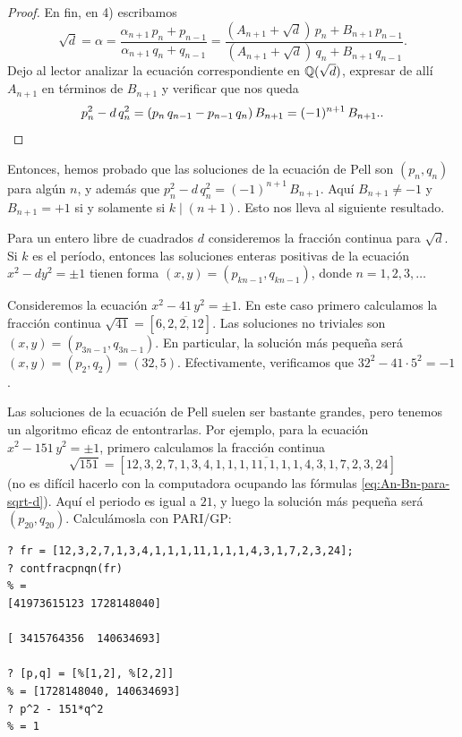 \begin{proposicion}
\begin{proof}
    En fin, en 4) escribamos
    \[ \sqrt{d} = \alpha =
       \frac{\alpha_{n+1}\,p_n + p_{n-1}}{\alpha_{n+1}\,q_n + q_{n-1}} =
       \frac{(A_{n+1} + \sqrt{d})\,p_n + B_{n+1}\,p_{n-1}}{(A_{n+1} + \sqrt{d})\,q_n + B_{n+1}\,q_{n-1}}. \]
    Dejo al lector analizar la ecuación correspondiente en $\mathbb{Q} (\sqrt{d})$,
    expresar de allí $A_{n+1}$ en términos de $B_{n+1}$ y verificar que nos
    queda
    \[ p_n^2 - d\,q_n^2 =
       (p_n\,q_{n-1} - p_{n-1}\,q_n)\,B_{n+1} = (-1)^{n+1}\,B_{n+1}. \qedhere. \]
  \end{proof}
\end{proposicion}

Entonces, hemos probado que las soluciones de la ecuación de Pell son
$(p_n,q_n)$ para algún $n$, y además que
$p_n^2 - d\,q_n^2 = (-1)^{n+1}\,B_{n+1}$. Aquí $B_{n+1} \ne -1$ y $B_{n+1} = +1$
si y solamente si $k \mid (n+1)$. Esto nos lleva al siguiente resultado.

\begin{teorema}
  Para un entero libre de cuadrados $d$ consideremos la fracción continua para
  $\sqrt{d}$. Si $k$ es el período, entonces las soluciones enteras positivas
  de la ecuación $x^2 - dy^2 = \pm 1$ tienen forma $(x,y) = (p_{kn-1}, q_{kn-1})$,
  donde $n = 1,2,3,\ldots$
\end{teorema}

\begin{ejemplo}
  Consideremos la ecuación $x^2 - 41\,y^2 = \pm 1$. En este caso primero
  calculamos la fracción continua $\sqrt{41} = [6, \overline{2,2,12}]$.
  Las soluciones no triviales son $(x,y) = (p_{3n-1}, q_{3n-1})$. En particular,
  la solución más pequeña será $(x,y) = (p_2,q_2) = (32,5)$.
  Efectivamente, verificamos que $32^2 - 41\cdot 5^2 = -1$.
\end{ejemplo}

\begin{ejemplo}
  Las soluciones de la ecuación de Pell suelen ser bastante grandes, pero
  tenemos un algoritmo eficaz de entontrarlas. Por ejemplo, para la ecuación
  $x^2 - 151\,y^2 = \pm 1$, primero calculamos la fracción continua
  $$\sqrt{151} = [12, \overline{3, 2, 7, 1, 3, 4, 1, 1, 1, 11, 1, 1, 1, 4, 3, 1, 7, 2, 3, 24}]$$
  (no es difícil hacerlo con la computadora ocupando las fórmulas
  \eqref{eq:An-Bn-para-sqrt-d}).  Aquí el periodo es igual a $21$, y luego
  la solución más pequeña será $(p_{20},q_{20})$. Calculámosla con PARI/GP:
\begin{shaded}
\begin{verbatim}
? fr = [12,3,2,7,1,3,4,1,1,1,11,1,1,1,4,3,1,7,2,3,24];
? contfracpnqn(fr)
% = 
[41973615123 1728148040]

[ 3415764356  140634693]

? [p,q] = [%[1,2], %[2,2]]
% = [1728148040, 140634693]
? p^2 - 151*q^2
% = 1
\end{verbatim}
\end{shaded}
\end{ejemplo}

